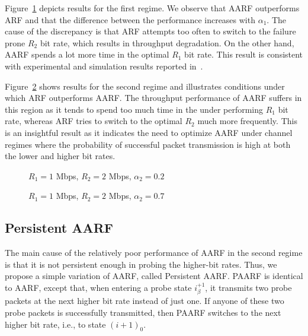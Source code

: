 \documentclass[11pt, journal, letterpaper, oneside, onecolumn]{IEEEtran}
\newcommand{\linegap}{1}
\begin{document}
Figure~\ref{fig:0.2} depicts results for the first regime. We
observe that AARF outperforms ARF and that the difference between
the performance increases with $\alpha_1$. The cause of the
discrepancy is that ARF attempts too often to switch to the
failure prone $R_2$ bit rate, which results in throughput
degradation. On the other hand, AARF spends a lot more time in the
optimal $R_1$ bit rate. This result is consistent with
experimental and simulation results reported
in~\cite{Bicket,AARF}.


Figure~\ref{fig:0.7} shows results for the second regime and
illustrates conditions under which ARF outperforms AARF.
The throughput performance of AARF suffers in this region as it
tends to spend too much time in the under performing $R_1$
bit rate, whereas ARF tries to switch to the optimal $R_2$ much
more frequently. This is an insightful result as it indicates the
need to optimize AARF under channel regimes where the probability
of successful packet transmission is high at both the lower and
higher bit rates.

\begin{figure}[t]
\centering {}
\caption{$R_{1}=1$ Mbps, $R_{2}=2$ Mbps, $\alpha_{2}=0.2$}
\label{fig:0.2}
\end{figure}\renewcommand{\baselinestretch}{\linegap}



\begin{figure}[t]
\centering {}
\caption{$R_{1}=1$ Mbps, $R_{2}=2$ Mbps, $\alpha_{2}=0.7$}
\label{fig:0.7}
\end{figure}\renewcommand{\baselinestretch}{\linegap}

\subsection{Persistent AARF}

The main cause of the relatively poor performance of AARF in the
second regime is that it is not persistent enough in probing the
higher-bit rates. Thus, we propose a simple variation of AARF,
called Persistent AARF. PAARF is identical to AARF, except that,
when entering a probe state $i^{+1}_{\beta}$, it transmits two
probe packets at the next higher bit rate instead of just one. If
anyone of these two probe packets is successfully transmitted,
then PAARF switches to the next higher bit rate, i.e., to state
$(i+1)_{0}$.
\end{document}
